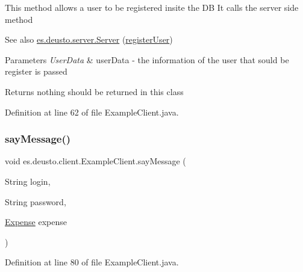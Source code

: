 This method allows a user to be registered insite the DB It calls the server side method \begin{DoxySeeAlso}{See also}
\hyperlink{classes_1_1deusto_1_1server_1_1_server}{es.\+deusto.\+server.\+Server} (\hyperlink{classes_1_1deusto_1_1client_1_1_example_client_a1c17371c17dde2b7664f2ad17ee79e4b}{register\+User}) 
\end{DoxySeeAlso}

\begin{DoxyParams}{Parameters}
{\em User\+Data} & user\+Data -\/ the information of the user that sould be register is passed \\
\hline
\end{DoxyParams}
\begin{DoxyReturn}{Returns}
nothing should be returned in this class 
\end{DoxyReturn}


Definition at line 62 of file Example\+Client.\+java.

\mbox{\label{classes_1_1deusto_1_1client_1_1_example_client_ae2e3b42bf8ef3a646d92e2b308e38005}} 
\subsubsection{\texorpdfstring{say\+Message()}{sayMessage()}}
{\footnotesize\ttfamily void es.\+deusto.\+client.\+Example\+Client.\+say\+Message (\begin{DoxyParamCaption}\item[{String}]{login,  }\item[{String}]{password,  }\item[{\hyperlink{classes_1_1deusto_1_1server_1_1jdo_1_1_expense}{Expense}}]{expense }\end{DoxyParamCaption})}



Definition at line 80 of file Example\+Client.\+java.

\mbox{\label{classes_1_1deusto_1_1client_1_1_example_client_a527d2790290c153cae5b16133a38269a}} 
